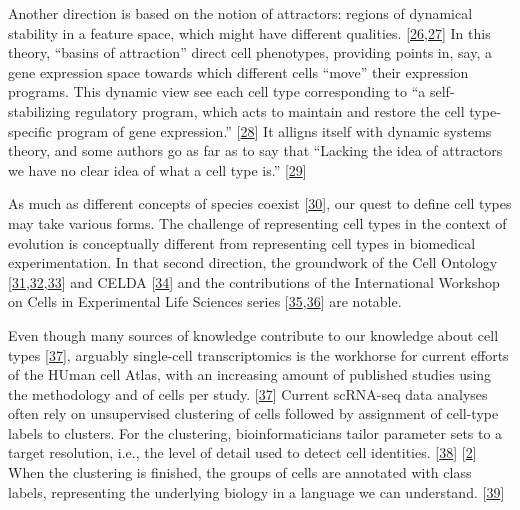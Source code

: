Another direction is based on the notion of attractors: regions of dynamical stability in a feature space, which might have different qualities. {[}\protect\hyperlink{ref-14J9lsoMd}{26},\protect\hyperlink{ref-OjxQDZpx}{27}{]} In this theory, ``basins of attraction'' direct cell phenotypes, providing points in, say, a gene expression space towards which different cells ``move'' their expression programs. This dynamic view see each cell type corresponding to ``a self-stabilizing regulatory program, which acts to maintain and restore the cell type-specific program of gene expression.'' {[}\protect\hyperlink{ref-19g5Iusf9}{28}{]} It alligns itself with dynamic systems theory, and some authors go as far as to say that ``Lacking the idea of attractors we have no clear idea of what a cell type is.'' {[}\protect\hyperlink{ref-4TJnL1xT}{29}{]}

As much as different concepts of species coexist {[}\protect\hyperlink{ref-g74dZjOM}{30}{]}, our quest to define cell types may take various forms. The challenge of representing cell types in the context of evolution is conceptually different from representing cell types in biomedical experimentation. In that second direction, the groundwork of the Cell Ontology {[}\protect\hyperlink{ref-1CI8uS6ka}{31},\protect\hyperlink{ref-gAysgnsS}{32},\protect\hyperlink{ref-17U3pGEjv}{33}{]} and CELDA {[}\protect\hyperlink{ref-RLHsA1U8}{34}{]} and the contributions of the International Workshop on Cells in Experimental Life Sciences series {[}\protect\hyperlink{ref-jX2ZmXcc}{35},\protect\hyperlink{ref-rK8KD0us}{36}{]} are notable.

Even though many sources of knowledge contribute to our knowledge about cell types {[}\protect\hyperlink{ref-16phbXNJE}{37}{]}, arguably single-cell transcriptomics is the workhorse for current efforts of the HUman cell Atlas, with an increasing amount of published studies using the methodology and of cells per study. {[}\protect\hyperlink{ref-16phbXNJE}{37}{]}
Current scRNA-seq data analyses often rely on unsupervised clustering of cells followed by assignment of cell-type labels to clusters.
For the clustering, bioinformaticians tailor parameter sets to a target resolution, i.e., the level of detail used to detect cell identities. {[}\protect\hyperlink{ref-WKbly37M}{38}{]} {[}\protect\hyperlink{ref-1GmbExweg}{2}{]}
When the clustering is finished, the groups of cells are annotated with class labels, representing the underlying biology in a language we can understand. {[}\protect\hyperlink{ref-ii1dVqoy}{39}{]}

